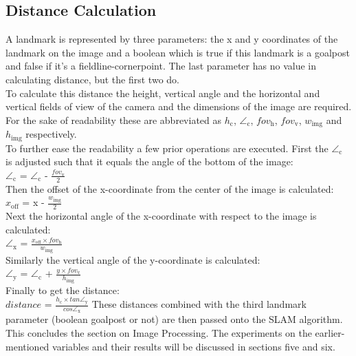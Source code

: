 \documentclass{ba-kecs}
\numberwithin{figure}{section}
\numberwithin{equation}{section}
\begin{document}
\subsection{Distance Calculation}
A landmark is represented by three parameters: the x and y coordinates of the landmark on the image and a boolean which is true if this landmark is a goalpost and false if it's a fieldline-cornerpoint. The last parameter has no value in calculating distance, but the first two do.\\
To calculate this distance the height, vertical angle and the horizontal and vertical fields of view of the camera and the dimensions of the image are required. For the sake of readability these are abbreviated as $h_{\mathrm{c}}$, $\angle_{\mathrm{c}}$, $fov_{\mathrm{h}}$, $fov_{\mathrm{v}}$, $w_{\mathrm{img}}$ and $h_{\mathrm{img}}$ respectively. \\
To further ease the readability a few prior operations are executed.
First the $\angle_{\mathrm{c}}$ is adjusted such that it equals the angle of the bottom of the image:\\
$\angle_{\mathrm{c}}$ = $\angle_{\mathrm{c}}$ - $\frac{fov_{\mathrm{v}}}{2}$ \\
Then the offset of the x-coordinate from the center of the image is calculated: \\
$x_{\mathrm{off}}$ = x - $\frac{w_{\mathrm{img}}}{2}$ \\
Next the horizontal angle of the x-coordinate with respect to the image is calculated: \\
$\angle_{\mathrm{x}}$ = $\frac{x_{\mathrm{off}} \times fov_{\mathrm{h}}}{w_{\mathrm{img}}}$ \\
Similarly the vertical angle of the y-coordinate is calculated: \\
$\angle_{\mathrm{y}}$ = $\angle_{\mathrm{c}}$ + $\frac{y \times fov_{\mathrm{v}}}{h_{\mathrm{img}}}$ \\
Finally to get the distance: \\
$\textit{distance}$ = $\frac{h_{\mathrm{c}} \times \textit{tan} \angle_{\mathrm{y}}}{\textit{cos} \angle_{\mathrm{x}}}$
These distances combined with the third landmark parameter (boolean goalpost or not) are then passed onto the SLAM algorithm. \\
This concludes the section on Image Processing. The experiments on the earlier-mentioned variables and their results will be discussed in sections five and six. 

\end{document}
